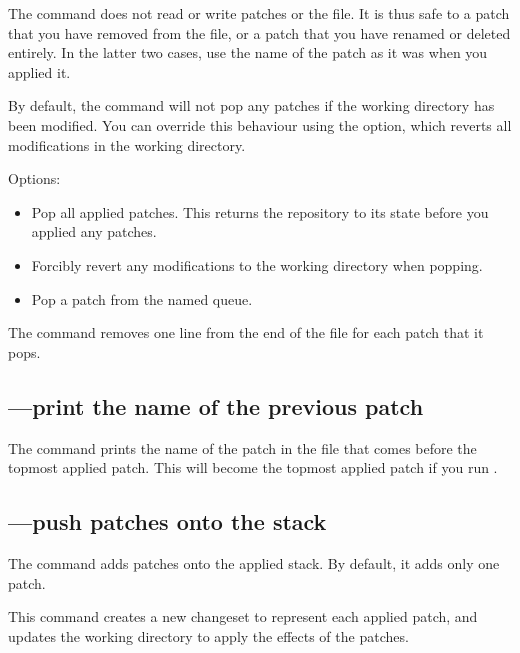 The  command does not read or write patches or the
 file.  It is thus safe to  a patch that
you have removed from the  file, or a patch that you
have renamed or deleted entirely.  In the latter two cases, use the
name of the patch as it was when you applied it.

By default, the  command will not pop any patches if the
working directory has been modified.  You can override this behaviour
using the  option, which reverts all modifications in
the working directory.

Options:
\begin{itemize}
\item[\hgxopt{mq}{qpop}{-a}] Pop all applied patches.  This returns the
  repository to its state before you applied any patches.
\item[\hgxopt{mq}{qpop}{-f}] Forcibly revert any modifications to the
  working directory when popping.
\item[\hgxopt{mq}{qpop}{-n}] Pop a patch from the named queue.
\end{itemize}

The  command removes one line from the end of the
 file for each patch that it pops.

\subsection{---print the name of the previous patch}

The  command prints the name of the patch in the
 file that comes before the topmost applied patch.
This will become the topmost applied patch if you run .

\subsection{---push patches onto the stack}
\label{sec:mqref:cmd:qpush}

The  command adds patches onto the applied stack.  By
default, it adds only one patch.

This command creates a new changeset to represent each applied patch,
and updates the working directory to apply the effects of the patches.

